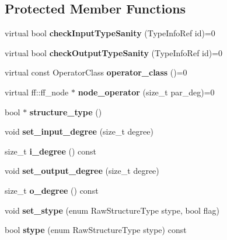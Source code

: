 \subsection*{\-Protected \-Member \-Functions}
\begin{DoxyCompactItemize}
\item 
\hypertarget{class_operator_a6af729a9d00cab0f62cf0e3de2548d39}{virtual bool {\bfseries check\-Input\-Type\-Sanity} (\-Type\-Info\-Ref id)=0}\label{class_operator_a6af729a9d00cab0f62cf0e3de2548d39}

\item 
\hypertarget{class_operator_aeacd17ae40fc541ee6a960ee45e405e6}{virtual bool {\bfseries check\-Output\-Type\-Sanity} (\-Type\-Info\-Ref id)=0}\label{class_operator_aeacd17ae40fc541ee6a960ee45e405e6}

\item 
\hypertarget{class_operator_a5b7ccb315884468f1683e83b3539f400}{virtual const \-Operator\-Class {\bfseries operator\-\_\-class} ()=0}\label{class_operator_a5b7ccb315884468f1683e83b3539f400}

\item 
\hypertarget{class_operator_ae9539b3351b16c22f7edbed01b987899}{virtual ff\-::ff\-\_\-node $\ast$ {\bfseries node\-\_\-operator} (size\-\_\-t par\-\_\-deg)=0}\label{class_operator_ae9539b3351b16c22f7edbed01b987899}

\item 
\hypertarget{class_operator_a2f0f76f195ffd9ee8f1fce2da7956926}{bool $\ast$ {\bfseries structure\-\_\-type} ()}\label{class_operator_a2f0f76f195ffd9ee8f1fce2da7956926}

\item 
\hypertarget{class_operator_a220b5efebda50b93c7fb29d997a12413}{void {\bfseries set\-\_\-input\-\_\-degree} (size\-\_\-t degree)}\label{class_operator_a220b5efebda50b93c7fb29d997a12413}

\item 
\hypertarget{class_operator_a49dbe907baab7d9d5ae44c96074fe873}{size\-\_\-t {\bfseries i\-\_\-degree} () const }\label{class_operator_a49dbe907baab7d9d5ae44c96074fe873}

\item 
\hypertarget{class_operator_a398b346d10ab14d3cb80e5b600219ff9}{void {\bfseries set\-\_\-output\-\_\-degree} (size\-\_\-t degree)}\label{class_operator_a398b346d10ab14d3cb80e5b600219ff9}

\item 
\hypertarget{class_operator_a8f4deb310b1665ae300aa3389d7b58b6}{size\-\_\-t {\bfseries o\-\_\-degree} () const }\label{class_operator_a8f4deb310b1665ae300aa3389d7b58b6}

\item 
\hypertarget{class_operator_aa690c335fa31d9b85f9c2e6271a0b018}{void {\bfseries set\-\_\-stype} (enum \-Raw\-Structure\-Type stype, bool flag)}\label{class_operator_aa690c335fa31d9b85f9c2e6271a0b018}

\item 
\hypertarget{class_operator_a910957044131a074f4fa7be8577a900a}{bool {\bfseries stype} (enum \-Raw\-Structure\-Type stype) const }\label{class_operator_a910957044131a074f4fa7be8577a900a}

\end{DoxyCompactItemize}
